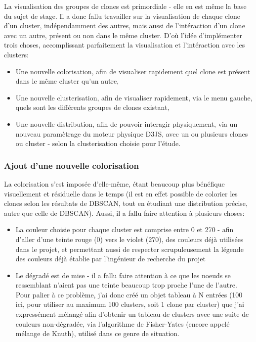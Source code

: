 \documentclass[12pt]{report}
\begin{document}
\begin{spacing}{1.2}
La visualisation des groupes de clones est primordiale - elle en est même la base du sujet de stage.
\newline
Il a donc fallu travailler sur la visualisation de chaque clone d'un cluster, indépendamment des autres, mais aussi de l'intéraction d'un clone avec un autre, présent ou non dans le même cluster.
\newline
D'où l'idée d'implémenter trois choses, accomplissant parfaitement la visualisation et l'intéraction avec les clusters:
	\begin{itemize}
	\item{Une nouvelle colorisation, afin de visualiser rapidement quel clone est présent dans le même cluster qu'un autre,}
	\item{Une nouvelle clusterisation, afin de visualiser rapidement, via le menu gauche, quels sont les différents groupes de clones existant,}
	\item{Une nouvelle distribution, afin de pouvoir interagir physiquement, via un nouveau paramètrage du moteur physique D3JS, avec un ou plusieurs clones ou cluster - selon la clusterisation choisie pour l'étude.}
	\end{itemize}

\subsubsection{Ajout d'une nouvelle colorisation}

La colorisation s'est imposée d'elle-même, étant beaucoup plus bénéfique visuellement et résiduelle dans le temps (il est en effet possible de colorier les clones selon les résultats de DBSCAN, tout en étudiant une distribution précise, autre que celle de DBSCAN).
\newline
Aussi, il a fallu faire attention à plusieurs choses:
	\begin{itemize}
		\item{La couleur choisie pour chaque cluster est comprise entre 0 et 270 - afin d'aller d'une teinte rouge (0) vers le violet (270), des couleurs déjà utilisées dans le projet, et permettant aussi de respecter scrupuleusement la légende des couleurs déjà établie par l'ingénieur de recherche du projet}
		\item{Le dégradé est de mise - il a fallu faire attention à ce que les noeuds se ressemblant n'aient pas une teinte beaucoup trop proche l'une de l'autre.
			\newline
			Pour palier à ce problème, j'ai donc créé un objet tableau à N entrées (100 ici, pour utiliser au maximum 100 clusters, soit 1 clone par cluster) que j'ai expressément mélangé afin d'obtenir un tableau de clusters avec une suite de couleurs non-dégradée, via l'algorithme de Fisher-Yates (encore appelé mélange de Knuth), utilisé dans ce genre de situation.}
	\end{itemize}


\end{spacing}
\end{document}
